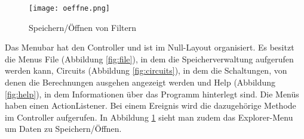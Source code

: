 \begin{figure}[H]
	\centering
	\texttt{[image: oeffne.png]}
	\caption{Speichern/Öffnen von Filtern}
	\label{fig:open}
\end{figure} 

Das Menubar hat den Controller und ist im Null-Layout organisiert. Es besitzt die Menus File (Abbildung \ref{fig:file}), in dem die Speicherverwaltung aufgerufen werden kann, Circuits (Abbildung \ref{fig:circuits}), in dem die Schaltungen, von denen die Berechnungen ausgehen angezeigt werden und Help (Abbildung \ref{fig:help}), in dem Informationen über das Programm hinterlegt sind. Die Menüs haben einen ActionListener. Bei einem Ereignis wird die dazugehörige Methode im Controller  aufgerufen. In Abbildung \ref{fig:open} sieht man zudem das Explorer-Menu um Daten zu Speichern/Öffnen.

\newpage

